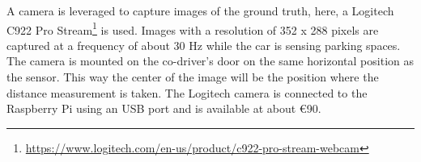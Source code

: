\begin{table}



\caption{Comparison of ultrasonic sensors and the used Lidar Lite v3 optical distance sensor.}
\label{table:comparison_us_lidar}
\end{table}

A camera is leveraged to capture images of the ground truth, here, a Logitech C922 Pro Stream\footnote{\url{https://www.logitech.com/en-us/product/c922-pro-stream-webcam}} is used. Images with a resolution of 352 x 288 pixels are captured at a frequency of about 30 Hz while the car is sensing parking spaces. The camera is mounted on the co-driver's door on the same horizontal position as the sensor. This way the center of the image will be the position where the distance measurement is taken. The Logitech camera is connected to the Raspberry Pi using an USB port and is available at about \euro{90}.





%
%
%


